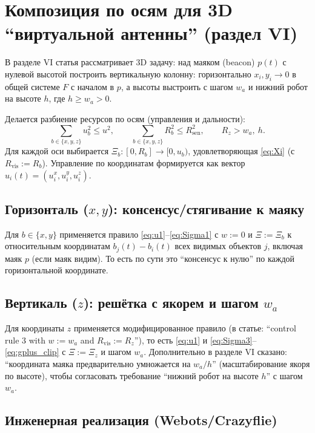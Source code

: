 \documentclass[12pt,a4paper]{article}
\begin{document}
\section{Композиция по осям для 3D ``виртуальной антенны'' (раздел VI)}

В разделе VI статья рассматривает 3D задачу: над маяком (beacon) $p(t)$ с нулевой высотой построить вертикальную колонну:
горизонтально $x_i,y_i\to 0$ в общей системе $F$ с началом в $p$, а высоты выстроить с шагом $w_a$ и нижний робот на высоте $h$,
где $h\ge w_a>0$.

Делается разбиение ресурсов по осям (управления и дальности):
\begin{equation}
  \sum_{b\in\{x,y,z\}} u_b^2 \le u^2,\qquad \sum_{b\in\{x,y,z\}} R_b^2 \le R_{\mathrm{sen}}^2,\qquad R_z > w_a,\ h.
\end{equation}
Для каждой оси выбирается $\Xi_b:[0,R_b]\to[0,u_b)$, удовлетворяющая \eqref{eq:Xi} (с $R_{\mathrm{vis}}:=R_b$).
Управление по координатам формируется как вектор $u_i(t)=(u_i^x,u_i^y,u_i^z)$.

\subsection*{Горизонталь ($x,y$): консенсус/стягивание к маяку}

Для $b\in\{x,y\}$ применяется правило \eqref{eq:u1}--\eqref{eq:Sigma1} с \textbf{$w:=0$} и $\Xi:=\Xi_b$ к
относительным координатам $b_j(t)-b_i(t)$ всех видимых объектов $j$, включая маяк $p$ (если маяк видим).
То есть по сути это ``консенсус к нулю'' по каждой горизонтальной координате.

\subsection*{Вертикаль ($z$): решётка с якорем и шагом $w_a$}

Для координаты $z$ применяется модифицированное правило (в статье: ``control rule 3 with $w:=w_a$ and $R_{\mathrm{vis}}:=R_z$''),
то есть \eqref{eq:u1} и \eqref{eq:Sigma3}--\eqref{eq:gplus_clip} с $\Xi:=\Xi_z$ и шагом $w_a$.
Дополнительно в разделе VI сказано: ``координата маяка предварительно умножается на $w_a/h$'' (масштабирование якоря по высоте),
чтобы согласовать требование ``нижний робот на высоте $h$'' с шагом $w_a$.

\subsection*{Инженерная реализация (Webots/Crazyflie)}
\end{document}
